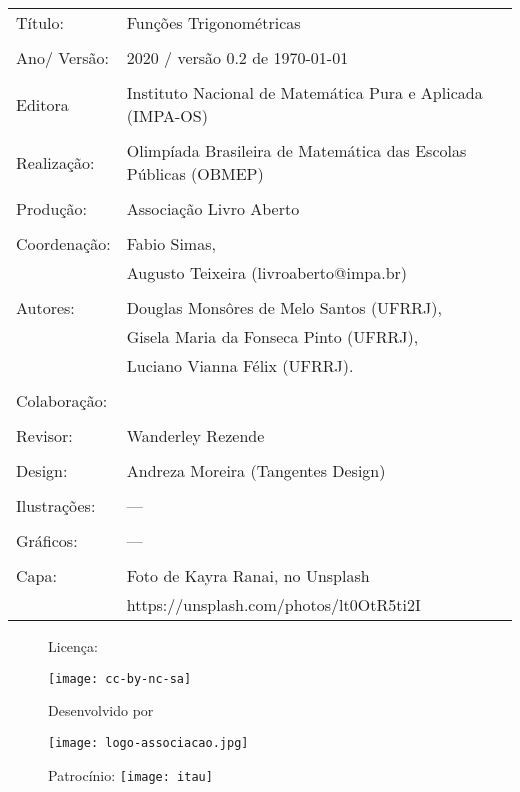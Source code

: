 \begin{tabular}{p{}p{}}
Título: & Funções Trigonométricas\\
\\
Ano/ Versão: & 2020 / versão 0.2 de \today\\
\\
Editora & Instituto Nacional de Matem\'atica Pura e Aplicada (IMPA-OS)\\
\\
Realização:& Olimp\'iada Brasileira de Matem\'atica das Escolas P\'ublicas (OBMEP)\\
\\
Produção:& Associação Livro Aberto\\
\\
Coordenação: & Fabio Simas, \\
			&  Augusto Teixeira (livroaberto@impa.br)\\
\\
  Autores: & Douglas Monsôres de Melo Santos (UFRRJ),\\
        & Gisela Maria da Fonseca Pinto (UFRRJ),\\
             & Luciano Vianna Félix (UFRRJ).\\
        
\\
Colaboração: & \\
\\
Revisor: & Wanderley Rezende \\
\\
Design: & Andreza Moreira (Tangentes Design) \\
\\
  Ilustrações: & --- \\ 
\\
Gráficos: & ---\\
\\
  Capa: & Foto de Kayra Ranai, no Unsplash \\
  		& https://unsplash.com/photos/lt0OtR5ti2I \\

\end{tabular}
\vspace{.5cm}



\begin{figure}[b]
\begin{minipage}[l]{5cm}
\centering

{\large Licença:}

  \texttt{[image: cc-by-nc-sa]}
\end{minipage}\hfill
\begin{minipage}[c]{5cm}
\centering
{\large Desenvolvido por}

\texttt{[image: logo-associacao.jpg]}
\end{minipage}
\begin{minipage}[r]{5cm}
\centering

{\large Patrocínio:}
  \vspace{1em}
  \texttt{[image: itau]}
\end{minipage}
\end{figure}


